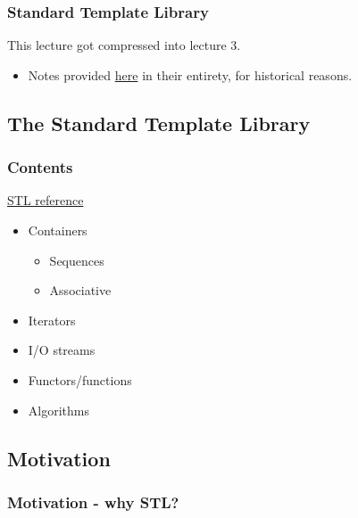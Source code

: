 \subsubsection{Standard Template
Library}\label{standard-template-library}

This lecture got compressed into lecture 3.

\begin{itemize}
\itemsep1pt\parskip0pt
\item
  Notes provided \href{sec01Intro}{here} in their entirety, for
  historical reasons.
\end{itemize}

\subsection{The Standard Template
Library}\label{the-standard-template-library}

\subsubsection{Contents}\label{contents}

\href{http://www.cplusplus.com/reference/}{STL reference}

\begin{itemize}
\itemsep1pt\parskip0pt
\item
  Containers

  \begin{itemize}
  \itemsep1pt\parskip0pt
  \item
    Sequences
  \item
    Associative
  \end{itemize}
\item
  Iterators
\item
  I/O streams
\item
  Functors/functions
\item
  Algorithms
\end{itemize}

\subsection{Motivation}\label{motivation}

\subsubsection{Motivation - why STL?}\label{motivation---why-stl}

